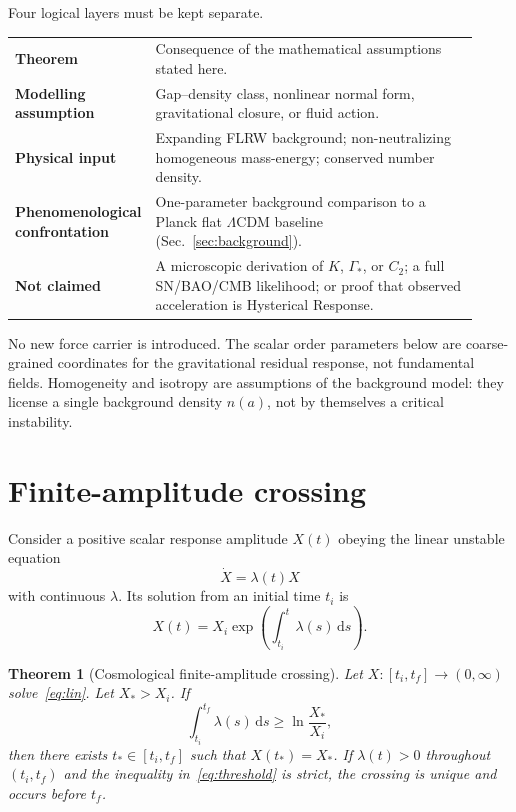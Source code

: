 \documentclass[11pt]{article}
\newtheorem{theorem}{Theorem}[section]
\theoremstyle{definition}
\theoremstyle{remark}
\newcommand{\dd}{\mathrm{d}}
\begin{document}
Four logical layers must be kept separate.
\begin{center}
\begin{tabular}{@{}>{\bfseries}p{0.22\linewidth}p{0.70\linewidth}@{}}
\toprule
Theorem & Consequence of the mathematical assumptions stated here.\\
Modelling assumption & Gap--density class, nonlinear normal form, gravitational closure, or fluid action.\\
Physical input & Expanding FLRW background; non-neutralizing homogeneous mass-energy; conserved number density.\\
Phenomenological confrontation & One-parameter background comparison to a Planck flat $\Lambda$CDM baseline (Sec.~\ref{sec:background}).\\
Not claimed & A microscopic derivation of $K$, $\Gamma_*$, or $C_2$; a full SN/BAO/CMB likelihood; or proof that observed acceleration is Hysterical Response.\\
\bottomrule
\end{tabular}
\end{center}

No new force carrier is introduced.
The scalar order parameters below are coarse-grained coordinates for the gravitational residual response, not fundamental fields.
Homogeneity and isotropy are assumptions of the background model: they license a single background density $n(a)$, not by themselves a critical instability.

\section{Finite-amplitude crossing}
\label{sec:crossing}
Consider a positive scalar response amplitude $X(t)$ obeying the linear unstable equation
\begin{equation}
\label{eq:lin}
\dot X=\lambda(t)X
\end{equation}
with continuous $\lambda$.
Its solution from an initial time $t_i$ is
\begin{equation}
\label{eq:soltime}
X(t)=X_i\exp\!\left(\int_{t_i}^{t}\lambda(s)\,\dd s\right).
\end{equation}

\begin{theorem}[Cosmological finite-amplitude crossing]
\label{thm:crossing}
Let $X:[t_i,t_f]\to(0,\infty)$ solve~\eqref{eq:lin}.
Let $X_*>X_i$.
If
\begin{equation}
\label{eq:threshold}
\int_{t_i}^{t_f}\lambda(s)\,\dd s\ge\ln\frac{X_*}{X_i},
\end{equation}
then there exists $t_*\in[t_i,t_f]$ such that $X(t_*)=X_*$.
If $\lambda(t)>0$ throughout $(t_i,t_f)$ and the inequality in~\eqref{eq:threshold} is strict, the crossing is unique and occurs before $t_f$.
\end{theorem}
\end{document}
